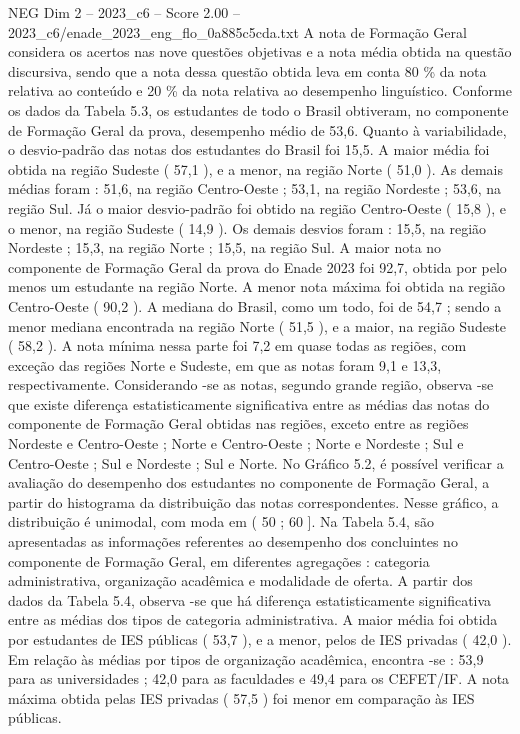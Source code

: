 \begin{textsample}{NEG Dim 2 – 2023\_c6 – Score 2.00 – 2023\_c6/enade\_2023\_eng\_flo\_0a885c5cda.txt}
A nota de Formação Geral considera os acertos nas nove questões objetivas e a nota média obtida na questão discursiva, sendo que a nota dessa questão obtida leva em conta 80 \% da nota relativa ao conteúdo e 20 \% da nota relativa ao desempenho linguístico.
Conforme os dados da Tabela 5.3, os estudantes de todo o Brasil obtiveram, no componente de Formação Geral da prova, desempenho médio de 53,6.
Quanto à variabilidade, o desvio-padrão das notas dos estudantes do Brasil foi 15,5.
A maior média foi obtida na região Sudeste ( 57,1 ), e a menor, na região Norte ( 51,0 ).
As demais médias foram : 51,6, na região Centro-Oeste ; 53,1, na região Nordeste ; 53,6, na região Sul.
Já o maior desvio-padrão foi obtido na região Centro-Oeste ( 15,8 ), e o menor, na região Sudeste ( 14,9 ).
Os demais desvios foram : 15,5, na região Nordeste ; 15,3, na região Norte ; 15,5, na região Sul.
A maior nota no componente de Formação Geral da prova do Enade 2023 foi 92,7, obtida por pelo menos um estudante na região Norte.
A menor nota máxima foi obtida na região Centro-Oeste ( 90,2 ).
A mediana do Brasil, como um todo, foi de 54,7 ; sendo a menor mediana encontrada na região Norte ( 51,5 ), e a maior, na região Sudeste ( 58,2 ).
A nota mínima nessa parte foi 7,2 em quase todas as regiões, com exceção das regiões Norte e Sudeste, em que as notas foram 9,1 e 13,3, respectivamente.
Considerando -se as notas, segundo grande região, observa -se que existe diferença estatisticamente significativa entre as médias das notas do componente de Formação Geral obtidas nas regiões, exceto entre as regiões Nordeste e Centro-Oeste ; Norte e Centro-Oeste ; Norte e Nordeste ; Sul e Centro-Oeste ; Sul e Nordeste ; Sul e Norte.
No Gráfico 5.2, é possível verificar a avaliação do desempenho dos estudantes no componente de Formação Geral, a partir do histograma da distribuição das notas correspondentes.
Nesse gráfico, a distribuição é unimodal, com moda em ( 50 ; 60 ].
Na Tabela 5.4, são apresentadas as informações referentes ao desempenho dos concluintes no componente de Formação Geral, em diferentes agregações : categoria administrativa, organização acadêmica e modalidade de oferta.
A partir dos dados da Tabela 5.4, observa -se que há diferença estatisticamente significativa entre as médias dos tipos de categoria administrativa.
A maior média foi obtida por estudantes de IES públicas ( 53,7 ), e a menor, pelos de IES privadas ( 42,0 ).
Em relação às médias por tipos de organização acadêmica, encontra -se : 53,9 para as universidades ; 42,0 para as faculdades e 49,4 para os CEFET/IF.
A nota máxima obtida pelas IES privadas ( 57,5 ) foi menor em comparação às IES públicas.

\end{textsample}
